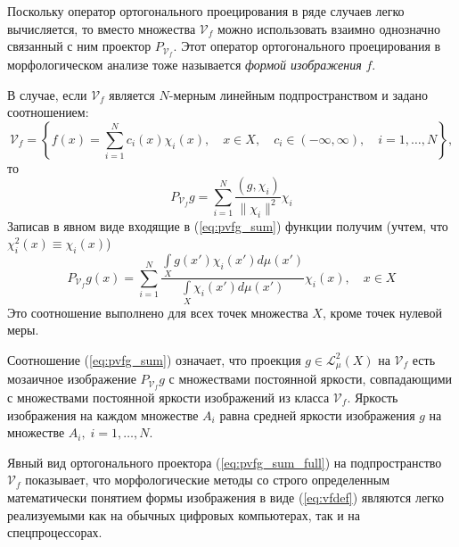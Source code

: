 Поскольку оператор ортогонального проецирования в ряде случаев легко вычисляется, то вместо множества $\mathcal{V}_f$
можно использовать взаимно однозначно связанный с ним проектор $P_{\mathcal{V}_f}$. Этот оператор ортогонального проецирования
в морфологическом анализе тоже называется \emph{формой изображения} $f$.

\begin{samepage}

В случае, если $\mathcal{V}_f$ является $N$-мерным линейным подпространством и задано соотношением:
\begin{equation*}
\mathcal{V}_f = \left\{  f(x) = \sum\limits_{i=1}^{N} c_i(x)\chi_i(x), \quad x \in X,\quad c_i \in (-\infty, \infty),\quad i=1, \dots ,N \right\},
\end{equation*}
то
\begin{equation}\label{eq:pvfg_sum}
P_{\mathcal{V}_f}g = \sum\limits_{i=1}^{N}\frac{(g, \chi_i)}{\|\chi_i\|^2}\chi_i
\end{equation}
Записав в явном виде входящие в (\ref{eq:pvfg_sum}) функции получим
(учтем, что $\chi^2_i(x) \equiv \chi_i(x)$)
\begin{equation}\label{eq:pvfg_sum_full}
P_{\mathcal{V}_f}g(x) = \sum\limits_{i=1}^{N}\frac{ \int\limits_Xg(x')\chi_i(x')d\mu(x') }{ \int\limits_X\chi_i(x')d\mu(x') }\chi_i(x), \quad x \in X
\end{equation}
Это соотношение выполнено для всех точек множества $X$, кроме точек нулевой меры.

\end{samepage}


Соотношение (\ref{eq:pvfg_sum}) означает, что проекция $g \in \mathcal{L}_{\mu}^2(X)$ на $\mathcal{V}_f$ есть мозаичное изображение $P_{\mathcal{V}_f}g$ с множествами постоянной
яркости, совпадающими с множествами постоянной яркости изображений из класса $\mathcal{V}_f$. Яркость изображения на
каждом множестве $A_i$ равна
средней яркости изображения $g$ на множестве $A_i, \; i=1, \dots ,N$.


Явный вид ортогонального проектора (\ref{eq:pvfg_sum_full}) на подпространство $\mathcal{V}_f$ показывает, что морфологические методы со строго определенным математически понятием формы изображения в виде (\ref{eq:vfdef}) являются легко реализуемыми как на обычных цифровых компьютерах, так и на спецпроцессорах.

%
%



